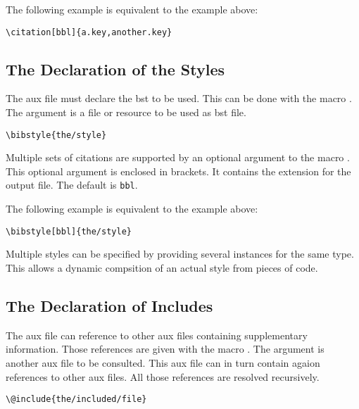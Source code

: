 The following example is equivalent to the example above:

\begin{lstlisting}[language={[LaTeX]TeX}]
  \citation[bbl]{a.key,another.key}
\end{lstlisting}


\subsection{The Declaration of the Styles}

The aux file must declare the bst to be used. This can be done with
the macro . The argument is a file or resource to be
used as bst file.

\begin{lstlisting}[language={[LaTeX]TeX}]
  \bibstyle{the/style}
\end{lstlisting}

Multiple sets of citations are supported by an optional argument to
the macro . This optional argument is enclosed in
brackets. It contains the extension for the output file. The default
is \texttt{bbl}.

The following example is equivalent to the example above:

\begin{lstlisting}[language={[LaTeX]TeX}]
  \bibstyle[bbl]{the/style}
\end{lstlisting}

Multiple styles can be specified by providing several 
instances for the same type. This allows a dynamic compsition of an
actual style from pieces of code.


\subsection{The Declaration of Includes}

The aux file can reference to other aux files containing supplementary
information. Those references are given  with the macro
. The argument is another aux file to be consulted.
This aux file can in turn contain agaion references to other aux
files. All those references are resolved recursively.

\begin{lstlisting}[language={[LaTeX]TeX},%
  alsoletter={@},morekeywords={@include}]
  \@include{the/included/file}
\end{lstlisting}


